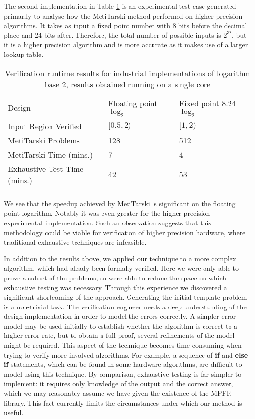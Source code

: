 The second implementation in Table \ref{result} is an experimental test case generated primarily to analyse how the MetiTarski method performed on higher precision algorithms. It takes as input a fixed point number with 8 bits before the decimal place and 24 bits after. Therefore, the total number of possible inputs is $2^{32}$, but it is a higher precision algorithm and is more accurate as it makes use of a larger lookup table.
\begin{table}[h]
\caption{Verification runtime results for industrial implementations of logarithm base 2, results obtained running on a single core}
\label{result}     
\begin{tabular}{lll}
\hline\noalign{\smallskip}
Design & Floating point $\log_2$ & Fixed point 8.24 $\log_2$    \\

\noalign{\smallskip}\hline\noalign{\smallskip}

 Input Region Verified& $[0.5,2)$ & $[1,2) $ \\ 
 MetiTarski Problems & 128 & 512 \\
 MetiTarski Time (mins.) &  7 & 4 \\ 
 Exhaustive Test Time (mins.) & 42 & 53 \\
\noalign{\smallskip}\hline
\end{tabular}
\end{table}
We see that the speedup achieved by MetiTarski is significant on the floating point logarithm. Notably it was even greater for the higher precision experimental implementation. Such an observation suggests that this methodology could be viable for verification of higher precision hardware, where traditional exhaustive techniques are infeasible. 

In addition to the results above, we applied our technique to a more complex algorithm, which had aleady been formally verified. Here we were only able to prove a subset of the problems, so were able to reduce the space on which exhaustive testing was necessary. Through this experience we discovered a significant shortcoming of the approach. Generating the initial template problem is a non-trivial task. The verification engineer needs a deep understanding of the design implementation in order to model the errors correctly. A simpler error model may be used initially to establish whether the algorithm is correct to a higher error rate, but to obtain a full proof, several refinements of the model might be required. This aspect of the technique becomes time consuming when trying to verify more involved algorithms. For example, a sequence of \textbf{if} and \textbf{else if} statements, which can be found in some hardware algorithms, are difficult to model using this technique. By comparison, exhaustive testing is far simpler to implement: it requires only knowledge of the output and the correct answer, which we may reasonably assume we have given the existence of the MPFR library. This fact currently limits the circumstances under which our method is useful. 


